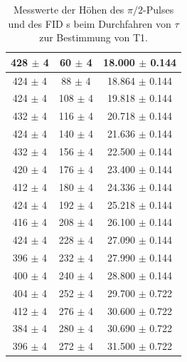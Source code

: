 \documentclass[12pt,a4paper]{article}
\begin{document}
\begin{table}
\begin{tabular}{|c|c|c|}
428 $\pm$ 4 & 60 $\pm$ 4 & 18.000 $\pm$ 0.144 \\ 
\hline 
424 $\pm$ 4 & 88 $\pm$ 4 & 18.864 $\pm$ 0.144 \\ 
\hline 
424 $\pm$ 4 & 108 $\pm$ 4 & 19.818 $\pm$ 0.144 \\ 
\hline 
432 $\pm$ 4 & 116 $\pm$ 4 & 20.718 $\pm$ 0.144 \\ 
\hline 
424 $\pm$ 4 & 140 $\pm$ 4 & 21.636 $\pm$ 0.144 \\ 
\hline 
432 $\pm$ 4 & 156 $\pm$ 4 & 22.500 $\pm$ 0.144 \\ 
\hline 
420 $\pm$ 4 & 176 $\pm$ 4 & 23.400 $\pm$ 0.144 \\ 
\hline 
412 $\pm$ 4 & 180 $\pm$ 4 & 24.336 $\pm$ 0.144 \\ 
\hline 
424 $\pm$ 4 & 192 $\pm$ 4 & 25.218 $\pm$ 0.144 \\ 
\hline 
416 $\pm$ 4 & 208 $\pm$ 4 & 26.100 $\pm$ 0.144 \\ 
\hline 
424 $\pm$ 4 & 228 $\pm$ 4 & 27.090 $\pm$ 0.144 \\ 
\hline 
396 $\pm$ 4 & 232 $\pm$ 4 & 27.990 $\pm$ 0.144 \\ 
\hline 
400 $\pm$ 4 & 240 $\pm$ 4 & 28.800 $\pm$ 0.144 \\ 
\hline 
404 $\pm$ 4 & 252 $\pm$ 4 & 29.700 $\pm$ 0.722 \\ 
\hline 
412 $\pm$ 4 & 276 $\pm$ 4 & 30.600 $\pm$ 0.722 \\ 
\hline 
384 $\pm$ 4 & 280 $\pm$ 4 & 30.690 $\pm$ 0.722 \\ 
\hline 
396 $\pm$ 4 & 272 $\pm$ 4 & 31.500 $\pm$ 0.722 \\ 
\hline 
\end{tabular} 
\caption{Messwerte der Höhen des $\pi /2$-Pulses und des FID s beim Durchfahren von $\tau$ zur Bestimmung von T1.}
\label{tab:T1_Daten}
\end{table}
\end{document}
